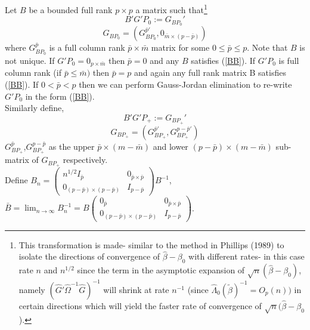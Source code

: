 \documentclass[11pt, fleqn]{article}
\begin{document}
  Let $B$ be  a bounded full rank $p\times p$ a matrix such that\footnote{This transformation is made- similar to the method in Phillips (1989) to isolate the directions of convergence of $\hat{\beta}-\beta_0$ with different rates- in this case rate $n$ and $n^{1/2}$ since the term in the asymptotic expansion of $\sqrt{n}(\hat{\beta}-\beta_0)$, namely $(\hat{G}'\hat{\Omega}^{-1}\hat{G})^{-1} $ will shrink at rate $n^{-1}$ (since $\hat{\Lambda}_0(\tilde{\beta})^{-1}=O_p(n))$ in certain directions which will yield the faster rate of convergence of  $\sqrt{n}(\hat{\beta}-\beta_0$).}
  \begin{equation}\label{B}  B'G'P_0:=G_{BP_0}'\end{equation}
  \begin{equation}\label{BB} G_{BP_0}=\left(G_{BP_0}^{\bar{p}'}, 0_{ \bar{m}\times(p-\bar{p})}\right)\end{equation}
  where $G_{BP_0}^{\bar{p}}$ is  a full column rank $ \bar{p}\times \bar{m}$ matrix for some $0\leq \bar{p}\leq p$. Note that $B$ is not unique. If $G'P_0=0_{p\times \bar{m}}$ then $\bar{p}=0$ and any $B$ satisfies (\ref{BB}). If $G'P_0$ is full column rank  (if $\bar{p}\leq\bar{m})$ then $\bar{p}=p$ and again any full rank matrix B satisfies (\ref{BB}). If $0<\bar{p}<p$ then we can perform Gauss-Jordan elimination to re-write $G'P_0$ in the form (\ref{BB}).\\
  Similarly define,
 \begin{equation} B'G'P_+:=G_{BP_+}'\end{equation}
 \begin{equation}G_{BP_+}=\left( G_{BP_+}^{\bar{p}'}, G_{BP_+}^{p-\bar{p}'} \right)\end{equation}
  $ G_{BP_+}^{\bar{p}}$,$ G_{BP_+}^{p-\bar{p}} $ as the upper $\bar{p}\times(m-\bar{m})$  and lower $(p-\bar{p})\times (m-\bar{m})$ sub-matrix of $G_{BP_+}$ respectively.\\



  Define $B_n=\left(\begin{array}{cc} n^{1/2}I_{\bar{p}} & 0_{\bar{p}\times \bar{p}}\\ 0_{(p-\bar{p})\times (p-\bar{p})} & I_{p-\bar{p}}\end{array}\right)B^{-1}$,  $\bar{B}=\lim_{n\rightarrow\infty} B_n^{-1}=B\left(\begin{array}{cc} 0_{\bar{p}} & 0_{\bar{p}\times \bar{p}}\\ 0_{(p-\bar{p})\times (p-\bar{p})} & I_{p-\bar{p}}\end{array}\right)$.\\
\end{document}
